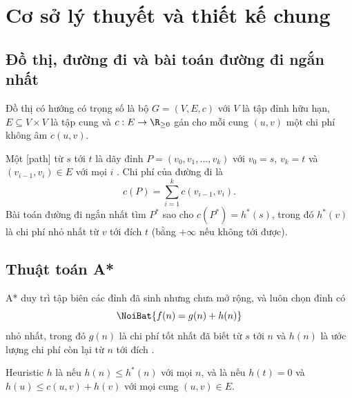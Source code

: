 \chapter{Cơ sở lý thuyết và thiết kế chung}
\label{chap:co-so}

\section{Đồ thị, đường đi và bài toán đường đi ngắn nhất}
\label{sec:do-thi}

\begin{dinhnghia}
  Đồ thị có hướng có trọng số là bộ $G = (V, E, c)$ với $V$ là tập đỉnh hữu hạn,
  $E \subseteq V \times V$ là tập cung và $c : E \to \R_{\ge 0}$ gán cho mỗi cung $(u, v)$
  một chi phí không âm $c(u, v)$.
\end{dinhnghia}

Một [path] từ $s$ tới $t$ là dãy đỉnh $P = (v_0, v_1, \dots, v_k)$ với
$v_0 = s$, $v_k = t$ và $(v_{i-1}, v_i) \in E$ với mọi $i$ \cite{rosen2019}. Chi phí của đường
đi là
\begin{equation}
  c(P) = \sum_{i=1}^{k} c(v_{i-1}, v_i).
  \label{eq:chi-phi-duong}
\end{equation}
Bài toán đường đi ngắn nhất tìm $P^\ast$ sao cho $c(P^\ast) = h^\ast(s)$, trong đó
$h^\ast(v)$ là chi phí nhỏ nhất từ $v$ tới đích $t$ (bằng $+\infty$ nếu không tới được).

\section{Thuật toán A*}
\label{sec:astar}

A* duy trì tập biên \OPEN{} các đỉnh đã sinh nhưng chưa mở rộng, và luôn chọn đỉnh có
\begin{equation}
  \NoiBat{f(n) = g(n) + h(n)}
  \label{eq:f}
\end{equation}
nhỏ nhất, trong đó $g(n)$ là chi phí tốt nhất đã biết từ $s$ tới $n$ và $h(n)$ là ước lượng
chi phí còn lại từ $n$ tới đích \cite{hart1968, russell2021}.

\begin{dinhnghia}
  Heuristic $h$ là  nếu $h(n) \le h^\ast(n)$ với mọi $n$, và là
   nếu $h(t) = 0$ và $h(u) \le c(u, v) + h(v)$ với mọi cung $(u, v) \in E$.
\end{dinhnghia}

